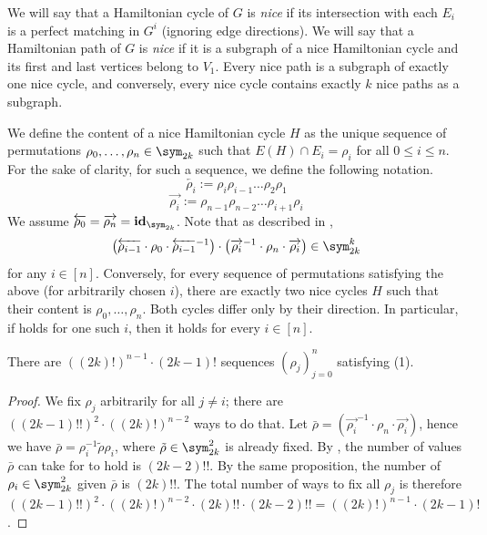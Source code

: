     
    We will say that a Hamiltonian cycle of $G$ is \emph{nice} if its intersection with each $E_i$ is a perfect matching in $G^i$ (ignoring edge directions). We will say that a Hamiltonian path of $G$ is \emph{nice} if it is a subgraph of a nice Hamiltonian cycle and its first and last vertices belong to $V_1$. Every nice path is a subgraph of exactly one nice cycle, and conversely, every nice cycle contains exactly $k$ nice paths as a subgraph.

    We define the content of a nice Hamiltonian cycle $H$ as the unique sequence of permutations $\rho_0, \dots, \rho_n \in \sym_{2k}$ such that $E(H) \cap E_i = \rho_i$ for all $0 \leq i \leq n$.
    For the sake of clarity, for such a sequence, we define the following notation.
    $$
        \overleftarrow{\rho_i} := \rho_i \rho_{i - 1} \dots \rho_2 \rho_1
    $$
    $$
        \overrightarrow{\rho_i} := \rho_{n - 1} \rho_{n - 2} \dots \rho_{i + 1} \rho_{i}
    $$
    We assume $\overleftarrow{\rho_0} = \overrightarrow{\rho_n} = \textbf{id}_{\sym_{2k}}$. 
    Note that as described in ,
    \begin{equation}\label{eq:dst_nice_cycles}
        \left(
            \overleftarrow{\rho_{i - 1}} \cdot
            \rho_0 \cdot
            \overleftarrow{\rho_{i - 1}}^{-1}
        \right)
        \cdot
        \left(
            \overrightarrow{\rho_i}^{-1} \cdot
            \rho_n \cdot
            \overrightarrow{\rho_i}
        \right)
        \in \sym_{2k}^k
    \end{equation}
    for any $i \in [n]$.
    Conversely, for every sequence of permutations satisfying the above (for arbitrarily chosen $i$), there are exactly two nice cycles $H$ such that their content is $\rho_0, \dots, \rho_n$. Both cycles differ only by their direction. In particular, if  holds for one such $i$, then it holds for every $i \in [n]$.

    \begin{claim}
        There are $((2k)!)^{n - 1} \cdot (2k - 1)!$ sequences $(\rho_j)_{j=0}^n$ satisfying (1).
    \end{claim}

    \begin{proof}
        We fix $\rho_j$ arbitrarily for all $j \neq i$; there are $((2k - 1)!!)^2 \cdot ((2k)!)^{n - 2}$ ways to do that. Let $\bar\rho = \left(\overrightarrow{\rho_i}^{-1} \cdot \rho_n \cdot \overrightarrow{\rho_i}\right)$, hence we have $\bar\rho = \rho_i^{-1} \tilde\rho \rho_i$, where $\tilde\rho \in \sym_{2k}^2$ is already fixed. By , the number of values $\bar\rho$ can take for  to hold is $(2k - 2)!!$. By the same proposition, the number of $\rho_i \in \sym_{2k}^2$ given $\bar\rho$ is $(2k)!!$. The total number of ways to fix all $\rho_j$ is therefore $((2k - 1)!!)^2 \cdot ((2k)!)^{n - 2} \cdot (2k)!! \cdot (2k - 2)!! = ((2k)!)^{n - 1} \cdot (2k - 1)!$.
    \end{proof}
    
